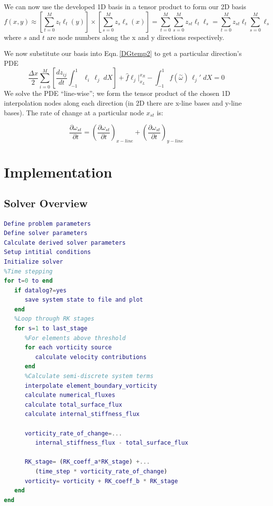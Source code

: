 \documentclass[]{aiaa-tc}%
\newcommand{\be}{\begin{equation}}
\newcommand{\ben}[1]{\begin{equation}\label{#1}}
\newcommand{\ee}{\end{equation}}
\newcommand{\aomega}{\overset{\sim}{\omega}}				%
\begin{document}
We can now use the developed 1D basis in a tensor product to form our 2D basis
\be f(x,y) \approx \left[\sum_{t=0}^M z_t \ell_t(y) \right] \times \left[ \sum_{s=0}^M z_s \ell_s(x) \right] = \sum_{t=0}^M \sum_{s=0}^M z_{st} \ell_t \ell_s =  \sum_{t=0}^M z_{st} \ell_t \sum_{s=0}^M  \ell_s \ee
where $s$ and $t$ are node numbers along the x and y directions respectively.

We now substitute our basis into Eqn.\,\eqref{DGtemp2} to get a particular direction's PDE
\ben{DGJoshTemp} \frac{\Delta x}{2}	\sum_{i=0}^M \left[ \frac{d z_{ij}}{dt}	\int_{-1}^{1}\ell_i  \, \ell_j \;dX \right]
+\hat{f}\ell_j \Big|^{x_R}_{x_L} 
- \int_{-1}^{1} f(\aomega) \, \ell_j' \;dX = 0 \ee
We solve the PDE ``line-wise''; we form the tensor product of the chosen 1D interpolation nodes along each direction (in 2D there are x-line bases and y-line bases). The rate of change at a particular node $x_{st}$ is:

\be \frac{\partial \omega_{st}}{\partial t} = (\frac{\partial \omega_{st}}{\partial t})_{x-line} + (\frac{\partial \omega_{st}}{\partial t})_{y-line} \ee

\section{Implementation}
\subsection{Solver Overview}
\begin{lstlisting}[language=Matlab]
Define problem parameters
Define solver parameters
Calculate derived solver parameters
Setup intitial conditions
Initialize solver
%Time stepping
for t=0 to end
   if datalog?=yes
      save system state to file and plot
   end
   %Loop through RK stages
   for s=1 to last_stage
      %For elements above threshold
      for each vorticity source
         calculate velocity contributions
      end
      %Calculate semi-discrete system terms
      interpolate element_boundary_vorticity
      calculate numerical_fluxes
      calculate total_surface_flux
      calculate internal_stiffness_flux
		
      vorticity_rate_of_change=...
         internal_stiffness_flux - total_surface_flux
		
      RK_stage= (RK_coeff_a*RK_stage) +...
         (time_step * vorticity_rate_of_change)
      vorticity= vorticity + RK_coeff_b * RK_stage
   end
end
\end{lstlisting}
\end{document}
